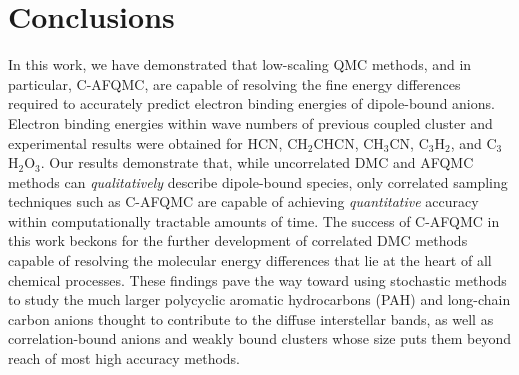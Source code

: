 \section{Conclusions}

In this work, we have demonstrated that low-scaling QMC methods, and in particular, C-AFQMC, are capable of resolving the fine energy differences required to accurately predict electron binding energies of dipole-bound anions.
Electron binding energies within wave numbers of previous coupled cluster and experimental results were obtained for HCN, CH$_{2}$CHCN, CH$_{3}$CN, C$_{3}$H$_{2}$, and C$_{3}$H$_{2}$O$_{3}$.
Our results demonstrate that, while uncorrelated DMC and AFQMC methods can \textit{qualitatively} describe dipole-bound species, only correlated sampling techniques such as C-AFQMC are capable of achieving \textit{quantitative} accuracy within computationally tractable amounts of time.
The success of C-AFQMC in this work beckons for the further development of correlated DMC methods capable of resolving the molecular energy differences that lie at the heart of all chemical processes.
These findings pave the way toward using stochastic methods to study the much larger polycyclic aromatic hydrocarbons (PAH) \cite{10.1021/acs.jpclett.5b01858} and long-chain carbon anions\cite{10.1086/311637} thought to contribute to the diffuse interstellar bands, as well as correlation-bound anions\cite{10.1021/jz400195s,10.1063/1.4991497} and weakly bound clusters \cite{10.1073/pnas.1715434115} whose size puts them beyond reach of most high accuracy methods.
